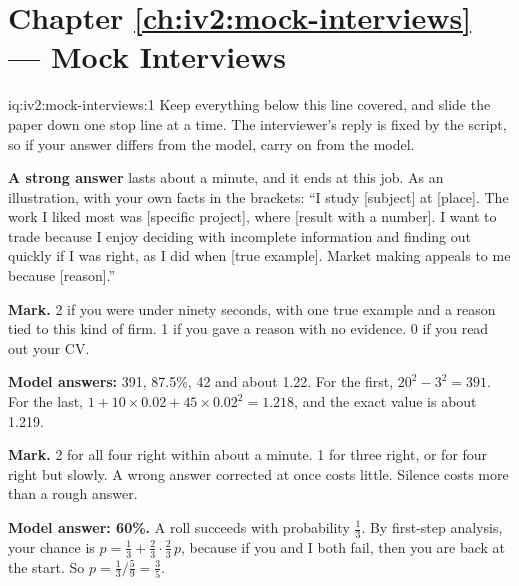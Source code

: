 \section*{Chapter \ref{ch:iv2:mock-interviews} --- Mock Interviews}

\begin{solution}{iq:iv2:mock-interviews:1}
Keep everything below this line covered, and slide the paper down one stop line at a time. The interviewer's reply is fixed by the script, so if your answer differs from the model, carry on from the model.

\ivstop
\textbf{A strong answer} lasts about a minute, and it ends at this job. As an illustration, with your own facts in the brackets: ``I study [subject] at [place]. The work I liked most was [specific project], where [result with a number]. I want to trade because I enjoy deciding with incomplete information and finding out quickly if I was right, as I did when [true example]. Market making appeals to me because [reason].''

\textbf{Mark.} 2 if you were under ninety seconds, with one true example and a reason tied to this kind of firm. 1 if you gave a reason with no evidence. 0 if you read out your CV.

\ivstop
\textbf{Model answers:} 391, 87.5\%, 42 and about 1.22. For the first, $20^2 - 3^2 = 391$. For the last, $1 + 10 \times 0.02 + 45 \times 0.02^2 = 1.218$, and the exact value is about 1.219.

\textbf{Mark.} 2 for all four right within about a minute. 1 for three right, or for four right but slowly. A wrong answer corrected at once costs little. Silence costs more than a rough answer.

\ivstop
\textbf{Model answer: 60\%.} A roll succeeds with probability $\tfrac13$. By first-step analysis, your chance is $p = \tfrac13 + \tfrac23 \cdot \tfrac23\, p$, because if you and I both fail, then you are back at the start. So $p = \tfrac13 \big/ \tfrac59 = \tfrac35$.


\end{solution}
